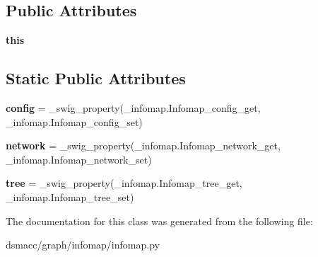 \subsection*{Public Attributes}
\begin{DoxyCompactItemize}
\item 
\mbox{\label{classdsmacc_1_1graph_1_1infomap_1_1infomap_1_1Infomap_a1519189f1957a22e8a087fcfca9a705b}} 
{\bfseries this}
\end{DoxyCompactItemize}
\subsection*{Static Public Attributes}
\begin{DoxyCompactItemize}
\item 
\mbox{\label{classdsmacc_1_1graph_1_1infomap_1_1infomap_1_1Infomap_ad8f7e009301e48a78d28d7575eddbaa4}} 
{\bfseries config} = \+\_\+swig\+\_\+property(\+\_\+infomap.\+Infomap\+\_\+config\+\_\+get, \+\_\+infomap.\+Infomap\+\_\+config\+\_\+set)
\item 
\mbox{\label{classdsmacc_1_1graph_1_1infomap_1_1infomap_1_1Infomap_a30870386de84c188f0bb76babdc97d2e}} 
{\bfseries network} = \+\_\+swig\+\_\+property(\+\_\+infomap.\+Infomap\+\_\+network\+\_\+get, \+\_\+infomap.\+Infomap\+\_\+network\+\_\+set)
\item 
\mbox{\label{classdsmacc_1_1graph_1_1infomap_1_1infomap_1_1Infomap_aa91c381d1fb5ebf1ae52078691ffb894}} 
{\bfseries tree} = \+\_\+swig\+\_\+property(\+\_\+infomap.\+Infomap\+\_\+tree\+\_\+get, \+\_\+infomap.\+Infomap\+\_\+tree\+\_\+set)
\end{DoxyCompactItemize}


The documentation for this class was generated from the following file\+:\begin{DoxyCompactItemize}
\item 
dsmacc/graph/infomap/infomap.\+py\end{DoxyCompactItemize}
